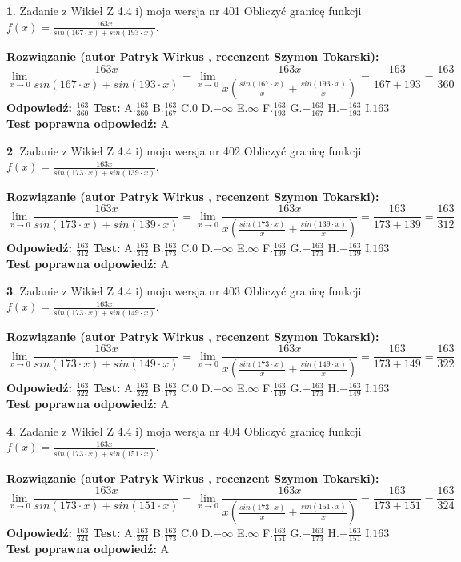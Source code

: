 \documentclass[12pt, a4paper]{article}
\theoremstyle{definition} %
\newtheorem{zad}{}
\newcommand{\zadStart}[1]{\begin{zad}#1\newline}
\newcommand{\zadStop}{\end{zad}}
\newcommand{\rozwStart}[2]{\noindent \textbf{Rozwiązanie (autor #1 , recenzent #2): }\newline}
\newcommand{\rozwStop}{\newline}
\newcommand{\odpStart}{\noindent \textbf{Odpowiedź:}\newline}
\newcommand{\odpStop}{\newline}
\newcommand{\testStart}{\noindent \textbf{Test:}\newline}
\newcommand{\testStop}{\newline}
\newcommand{\kluczStart}{\noindent \textbf{Test poprawna odpowiedź:}\newline}
\newcommand{\kluczStop}{\newline}
\begin{document}
\zadStart{Zadanie z Wikieł Z 4.4 i) moja wersja nr 401}
Obliczyć granicę funkcji $f(x)=\frac{163x}{sin(167\cdot x) +sin(193\cdot x)}$.
\zadStop
\rozwStart{Patryk Wirkus}{Szymon Tokarski}
$$\lim\limits_{x\to 0}\frac{163x}{sin(167\cdot x) +sin(193\cdot x)}=\lim\limits_{x\to 0}\frac{163x}{x(\frac{sin(167\cdot x)}{x}+\frac{sin(193\cdot x)}{x})}=\frac{163}{167+193} = \frac{163}{360}$$
\rozwStop
\odpStart
$\frac{163}{360}$
\odpStop
\testStart
A.$\frac{163}{360}$
B.$\frac{163}{167}$
C.$0$
D.$-\infty$
E.$\infty$
F.$\frac{163}{193}$
G.$-\frac{163}{167}$
H.$-\frac{163}{193}$
I.$163$
\testStop
\kluczStart
A
\kluczStop



\zadStart{Zadanie z Wikieł Z 4.4 i) moja wersja nr 402}
Obliczyć granicę funkcji $f(x)=\frac{163x}{sin(173\cdot x) +sin(139\cdot x)}$.
\zadStop
\rozwStart{Patryk Wirkus}{Szymon Tokarski}
$$\lim\limits_{x\to 0}\frac{163x}{sin(173\cdot x) +sin(139\cdot x)}=\lim\limits_{x\to 0}\frac{163x}{x(\frac{sin(173\cdot x)}{x}+\frac{sin(139\cdot x)}{x})}=\frac{163}{173+139} = \frac{163}{312}$$
\rozwStop
\odpStart
$\frac{163}{312}$
\odpStop
\testStart
A.$\frac{163}{312}$
B.$\frac{163}{173}$
C.$0$
D.$-\infty$
E.$\infty$
F.$\frac{163}{139}$
G.$-\frac{163}{173}$
H.$-\frac{163}{139}$
I.$163$
\testStop
\kluczStart
A
\kluczStop



\zadStart{Zadanie z Wikieł Z 4.4 i) moja wersja nr 403}
Obliczyć granicę funkcji $f(x)=\frac{163x}{sin(173\cdot x) +sin(149\cdot x)}$.
\zadStop
\rozwStart{Patryk Wirkus}{Szymon Tokarski}
$$\lim\limits_{x\to 0}\frac{163x}{sin(173\cdot x) +sin(149\cdot x)}=\lim\limits_{x\to 0}\frac{163x}{x(\frac{sin(173\cdot x)}{x}+\frac{sin(149\cdot x)}{x})}=\frac{163}{173+149} = \frac{163}{322}$$
\rozwStop
\odpStart
$\frac{163}{322}$
\odpStop
\testStart
A.$\frac{163}{322}$
B.$\frac{163}{173}$
C.$0$
D.$-\infty$
E.$\infty$
F.$\frac{163}{149}$
G.$-\frac{163}{173}$
H.$-\frac{163}{149}$
I.$163$
\testStop
\kluczStart
A
\kluczStop



\zadStart{Zadanie z Wikieł Z 4.4 i) moja wersja nr 404}
Obliczyć granicę funkcji $f(x)=\frac{163x}{sin(173\cdot x) +sin(151\cdot x)}$.
\zadStop
\rozwStart{Patryk Wirkus}{Szymon Tokarski}
$$\lim\limits_{x\to 0}\frac{163x}{sin(173\cdot x) +sin(151\cdot x)}=\lim\limits_{x\to 0}\frac{163x}{x(\frac{sin(173\cdot x)}{x}+\frac{sin(151\cdot x)}{x})}=\frac{163}{173+151} = \frac{163}{324}$$
\rozwStop
\odpStart
$\frac{163}{324}$
\odpStop
\testStart
A.$\frac{163}{324}$
B.$\frac{163}{173}$
C.$0$
D.$-\infty$
E.$\infty$
F.$\frac{163}{151}$
G.$-\frac{163}{173}$
H.$-\frac{163}{151}$
I.$163$
\testStop
\kluczStart
A
\kluczStop
\end{document}
